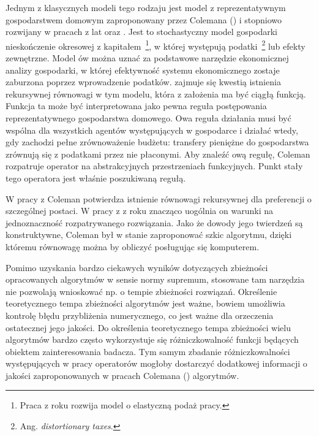 	Jednym z klasycznych modeli tego rodzaju jest model z reprezentatywnym gospodarstwem domowym zaproponowany przez Colemana (\citeyear{Coleman1}) i stopniowo rozwijany w pracach z lat \citeyear{Coleman_1997} oraz \citeyear{Coleman2}. Jest to stochastyczny model gospodarki nieskończenie okresowej z kapitałem~\footnote{Praca z roku \citeyear{Coleman_1997} rozwija model o elastyczną podaż pracy.}, w której występują podatki~\footnote{Ang. {\it distortionary taxes}.} lub efekty zewnętrzne. Model ów można uznać za podstawowe narzędzie ekonomicznej analizy gospodarki, w której efektywność systemu ekonomicznego zostaje zaburzona poprzez wprowadzenie podatków. \citet{Coleman1} zajmuje się kwestią istnienia rekursywnej równowagi w tym modelu, która z założenia ma być ciągłą funkcją. Funkcja ta może być interpretowana jako pewna reguła postępowania reprezentatywnego gospodarstwa domowego. Owa reguła działania musi być wspólna dla wszystkich agentów występujących w gospodarce i działać wtedy, gdy zachodzi pełne zrównoważenie budżetu: transfery pieniężne do gospodarstwa zrównują się z podatkami przez nie płaconymi. Aby znaleźć ową regułę, Coleman rozpatruje operator na abstrakcyjnych przestrzeniach funkcyjnych. Punkt stały tego operatora jest właśnie poszukiwaną regułą.    
	
	W pracy z \citeyear{Coleman1} Coleman potwierdza istnienie równowagi rekursywnej dla preferencji o szczególnej postaci. W pracy z z \citeyear{Coleman2} roku znacząco uogólnia on warunki na jednoznaczność rozpatrywanego rozwiązania. Jako że dowody jego twierdzeń są konstruktywne, Coleman był w stanie zaproponować szkic algorytmu, dzięki któremu równowagę można by obliczyć posługując się komputerem.	
	
	Pomimo uzyskania bardzo ciekawych wyników dotyczących zbieżności opracowanych algorytmów w sensie normy supremum, stosowane tam narzędzia nie pozwolają wnioskować np. o tempie zbieżności rozwiązań. Określenie teoretycznego tempa zbieżności algorytmów jest ważne, bowiem umożliwia kontrolę błędu przybliżenia numerycznego, co jest ważne dla orzeczenia ostatecznej jego jakości. Do określenia teoretycznego tempa zbieżności wielu algorytmów bardzo często wykorzystuje się różniczkowalność funkcji będących obiektem zainteresowania badacza. Tym samym zbadanie różniczkowalności występujących w pracy operatorów mogłoby dostarczyć dodatkowej informacji o jakości zaproponowanych w pracach Colemana (\citeyear{Coleman1, Coleman2}) algorytmów.     


